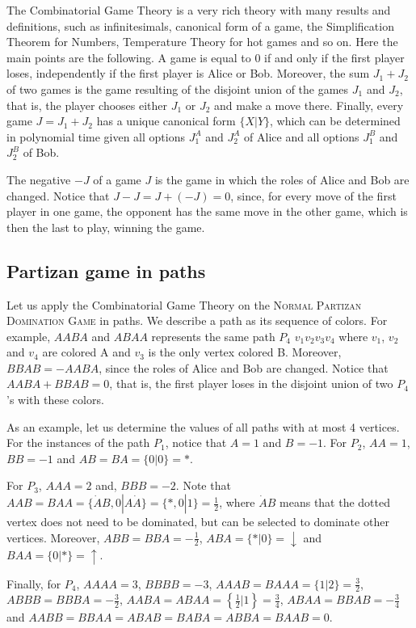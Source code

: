 \documentclass[12pt]{article}
\begin{document}
The Combinatorial Game Theory is a very rich theory with many results and definitions, such as infinitesimals, canonical form of a game, the Simplification Theorem for Numbers, Temperature Theory for hot games and so on.
Here the main points are the following. A game is equal to $0$ if and only if the first player loses, independently if the first player is Alice or Bob.
Moreover, the sum $J_1+J_2$ of two games is the game resulting of the disjoint union of the games $J_1$ and $J_2$, that is, the player chooses either $J_1$ or $J_2$ and make a move there.
Finally, every game $J=J_1+J_2$ has a unique canonical form $\{X|Y\}$, which can be determined in polynomial time given all options $J_1^A$ and $J_2^A$ of Alice and all options $J_1^B$ and $J_2^B$ of Bob.

The negative $-J$ of a game $J$ is the game in which the roles of Alice and Bob are changed. Notice that $J-J=J+(-J)=0$, since, for every move of the first player in one game, the opponent has the same move in the other game, which is then the last to play, winning the game.


\subsection{Partizan game in paths}

Let us apply the Combinatorial Game Theory on the \textsc{Normal Partizan Domination Game} in paths.
We describe a path as its sequence of colors. For example, $AABA$ and $ABAA$ represents the same path $P_4$ $v_1v_2v_3v_4$ where $v_1$, $v_2$ and $v_4$ are colored A and $v_3$ is the only vertex colored B. Moreover, $BBAB=-AABA$, since the roles of Alice and Bob are changed. Notice that $AABA+BBAB=0$, that is, the first player loses in the disjoint union of two $P_4$'s with these colors.

As an example, let us determine the values of all paths with at most 4 vertices. 
For the instances of the path $P_1$, notice that $A=1$ and $B=-1$.
For $P_2$, $AA=1$, $BB=-1$ and $AB=BA=\{0|0\}=*$. 

For $P_3$, $AAA=2$ and, $BBB=-2$.
Note that $AAB=BAA=\{\dot{A}B,0|A\dot{A}\}=\{*,0|1\}=\frac{1}{2}$, where $\dot{A}B$ means that the dotted vertex does not need to be dominated, but can be selected to dominate other vertices.
Moreover, $ABB=BBA=-\frac{1}{2}$, $ABA=\{*|0\}=\downarrow$ and $BAA=\{0|*\}=\uparrow$.

Finally, for $P_4$, $AAAA=3$, $BBBB=-3$, $AAAB=BAAA=\{1|2\}=\frac{3}{2}$, $ABBB=BBBA=-\frac{3}{2}$, $AABA=ABAA=\left\{\frac{1}{2}|1\right\}=\frac{3}{4}$, $ABAA=BBAB=-\frac{3}{4}$ and $AABB=BBAA=ABAB=BABA=ABBA=BAAB=0$.
\end{document}

